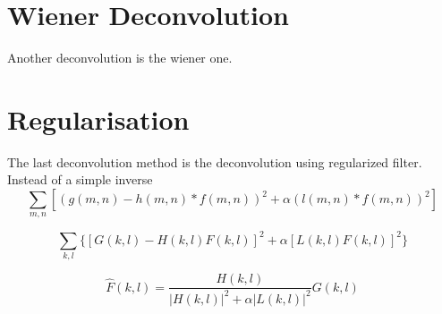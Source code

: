 \section{Wiener Deconvolution}
 Another deconvolution is the wiener one. 




\section{Regularisation}
The last deconvolution method is the deconvolution using regularized filter. 
Instead of a simple inverse 
\begin{equation}
\sum_{m,n} \left[ (g(m,n) - h(m,n)*f(m,n))^2 + \alpha (l(m,n)*f(m,n))^2 \right]
\end{equation}

\begin{equation}
\sum_{k,l} \{ [G(k,l) - H(k,l)F(k,l)]^2 + \alpha [L(k,l)F(k,l)]^2\}
\end{equation}


\begin{equation}
\hat{F}(k,l) = \frac{H(k,l)}{|H(k,l)|^2 + \alpha |L(k,l)|^2} G(k,l)
\end{equation}